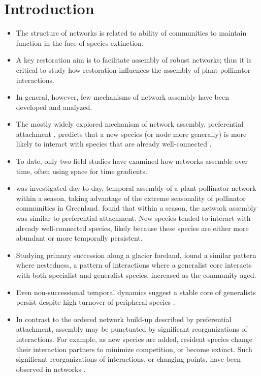 \documentclass[12pt]{article}
\begin{document}
\section*{Introduction}
\label{sec:introduction}
\begin{itemize}
\item The structure of networks is related to ability of communities
  to maintain function in the face of species extinction.
\item A key restoration aim is to facilitate assembly of robust
  networks; thus it is critical to study how restoration
  influences the assembly of plant-pollinator interactions.
\item In general, however, few mechanisms of network assembly have
  been developed and analyzed.
\item The mostly widely explored mechanism of network assembly,
  preferential attachment \citep{barabasi1999emergence}, predicts that
  a new species (or node more generally) is more likely to interact
  with species that are already well-connected \citep[''the
  rich-get-richer'' principle,][]{barabasi1999emergence}.
\item To date, only two field studies have examined how networks
  assemble over time, often using space for time gradients.
\item \cite{Olesen2008} was investigated day-to-day, temporal assembly
  of a plant-pollinator network within a season, taking advantage of
  the extreme seasonality of pollinator communities in Greenland.
  \cite{Olesen2008} found that within a season, the network assembly
  was similar to preferential attachment. New species tended to
  interact with already well-connected species, likely because these
  species are either more abundant or more temporally persistent.
\item Studying primary succession along a glacier foreland,
  \cite{albrecht2010plant} found a similar pattern where nestedness, a
  pattern of interactions where a generalist core interacts with both
  specialist and generalist species, increased as the community
  aged. %
\item Even non-successional temporal dynamics suggest a stable core of
  generalists persist despite high turnover of peripheral species
  \citep{fang2012relative, diaz2010changes, alarcon2008year}.
\item In contrast to the ordered network build-up described by
  preferential attachment, assembly may be punctuated by significant
  reorganizations of interactions. For example, as new species are
  added, resident species change their interaction partners to
  minimize competition, or become extinct. Such significant
  reorganizations of interactions, or changing points, have been
  observed in networks \citep{peel2014detecting}.
\end{itemize}
\end{document}
